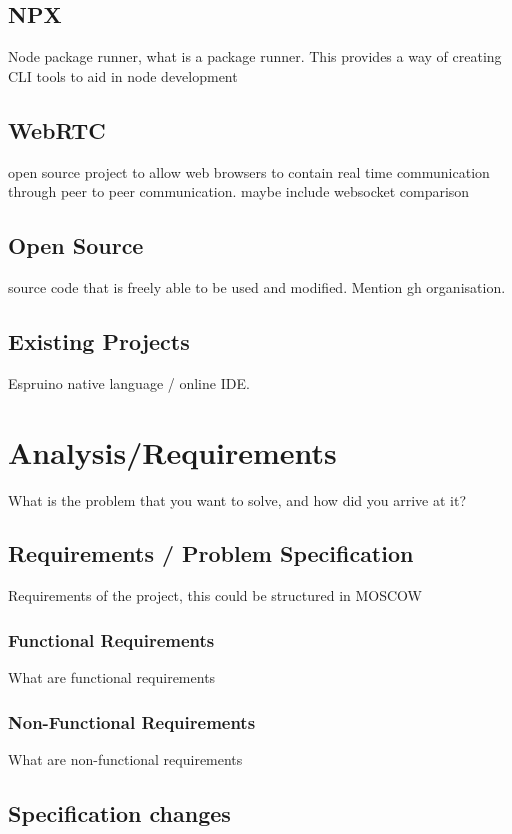 \documentclass{l4proj}
\begin{document}
\section{NPX}
\text Node package runner, what is a package runner. This provides a way of creating CLI tools to aid in node development

\section{WebRTC}
\text open source project to allow web browsers to contain real time communication through peer to peer communication. maybe include websocket comparison

\section{Open Source}
\text source code that is freely able to be used and modified. Mention gh organisation.

\section{Existing Projects}
\text Espruino native language / online IDE.

\chapter{Analysis/Requirements}
What is the problem that you want to solve, and how did you arrive at it?
\section{Requirements / Problem Specification}
\text Requirements of the project, this could be structured in MOSCOW
\subsection{Functional Requirements}
\text What are functional requirements
\subsection{Non-Functional Requirements}
\text What are non-functional requirements

\section{Specification changes}
\end{document}
